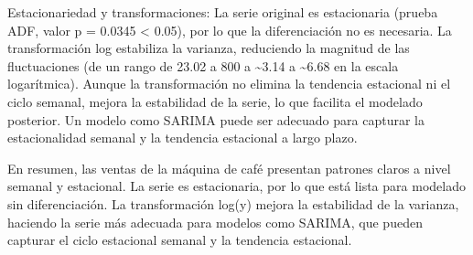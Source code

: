 \documentclass[
]{book}
\begin{document}
Estacionariedad y transformaciones: La serie original es estacionaria (prueba ADF, valor p = 0.0345 \textless{} 0.05), por lo que la diferenciación no es necesaria. La transformación log
estabiliza la varianza, reduciendo la magnitud de las fluctuaciones (de un rango de 23.02 a 800 a \textasciitilde3.14 a \textasciitilde6.68 en la escala logarítmica). Aunque la transformación no elimina la tendencia estacional ni el ciclo semanal, mejora la estabilidad de la serie, lo que facilita el modelado posterior. Un modelo como SARIMA puede ser adecuado para capturar la estacionalidad semanal y la tendencia estacional a largo plazo.

En resumen, las ventas de la máquina de café presentan patrones claros a nivel semanal y estacional. La serie es estacionaria, por lo que está lista para modelado sin diferenciación. La transformación log⁡(y)
mejora la estabilidad de la varianza, haciendo la serie más adecuada para modelos como SARIMA, que pueden capturar el ciclo estacional semanal y la tendencia estacional.

  
\end{document}
